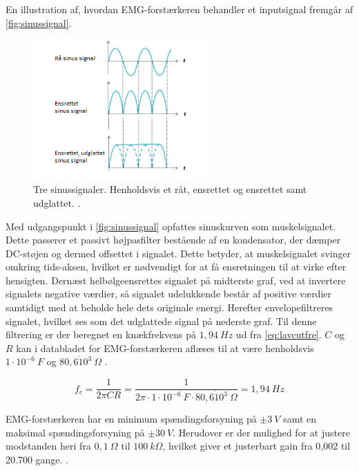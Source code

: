 En illustration af, hvordan EMG-forstærkeren behandler et inputsignal fremgår af \autoref{fig:sinussignal}.
\begin{figure}[H]
\centering
\includegraphics[width=0.6\textwidth]{figures/sinussignal.png}
\caption{Tre sinussignaler. Henholdsvis et råt, ensrettet og ensrettet samt udglattet. \citep{advancertech2013}.}
\label{fig:sinussignal}
\end{figure}

\noindent
Med udgangspunkt i \autoref{fig:sinussignal} opfattes sinuskurven som muskelsignalet. Dette passerer et passivt højpasfilter bestående af en kondensator, der dæmper DC-støjen og dermed offsettet i signalet. Dette betyder, at muskelsignalet svinger omkring tids-aksen, hvilket er nødvendigt for at få ensretningen til at virke efter hensigten. Dernæst helbølgeensrettes signalet på midterste graf, ved at invertere signalets negative værdier, så signalet udelukkende består af positive værdier samtidigt med at beholde hele dets originale energi. Herefter envelopefiltreres signalet, hvilket ses som det udglattede signal på nederste graf. Til denne filtrering er der beregnet en knækfrekvens på $1,94~Hz$ ud fra \autoref{eq:lavcutfre}. $C$ og $R$ kan i databladet for EMG-forstærkeren aflæses til at være henholdsvis $1 \cdot 10^{-6}~F$ og $80,6 \dot 10^3~\Omega$ \citep{advancertech2013}. 


\begin{equation}\label{eq:lavcutfre}
f_c = \frac{1}{2 \pi C R} = \frac{1}{2 \pi \cdot 1 \cdot 10^{-6}~F \cdot 80,6 \dot 10^3~\Omega} = 1,94~Hz
\end{equation}

EMG-forstærkeren har en minimum spændingsforsyning på $\pm 3~V$ samt en maksimal spændingsforsyning på $\pm 30~V$. Herudover er der mulighed for at justere modstanden heri fra $0,1~\Omega$ til $100~k\Omega$, hvilket giver et justerbart gain fra 0,002 til 20.700 gange. \citep{advancertech2013}. 